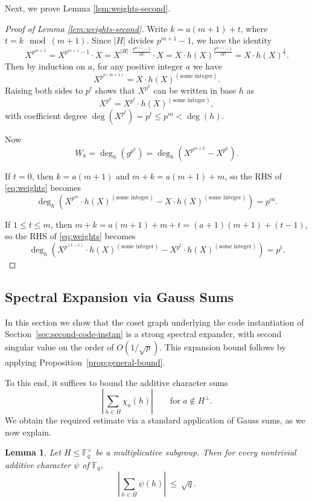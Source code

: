 \documentclass[11pt]{article}
\theoremstyle{plain}
\newtheorem{lemma}[theorem]{Lemma}
\theoremstyle{definition}
\begin{document}
Next, we prove Lemma \ref{lem:weights-second}.
\begin{proof}[Proof of Lemma \ref{lem:weights-second}] Write $k=a(m+1)+t$, where $t=k\mod (m+1).$ 
Since $|H|$ divides $p^{m+1}-1$, we have the identity
\[
X^{p^{m+1}} = X^{p^{m+1}-1}\cdot X = X^{|H|\cdot \frac{p^{m+1}-1}{|H|}}\cdot X
= X\cdot h(X)^{\frac{p^{m+1}-1}{|H|}}
= X\cdot h(X)^{\frac{1}{\gamma}}.
\]
Then by induction on $a$, for any positive integer $a$ we have
\[
X^{p^{a(m+1)}}=X\cdot h(X)^{(\text{some integer})}.
\]
Raising both sides to $p^t$ shows that $X^{p^k}$ can be written in base $h$ as
\[
X^{p^k}=X^{p^t}\cdot h(X)^{(\text{some integer})},
\]
with coefficient degree $\deg(X^{p^t})=p^t\leq p^m<\deg(h)$.

Now
\begin{equation}
\label{eq:weights}
W_k=\deg_h\left(g^{p^k}\right) = \deg_h\left(X^{p^{m+k}}-X^{p^k}\right).
\end{equation}

If $t=0$, then $k=a(m+1)$ and $m+k=a(m+1)+m$, so the RHS of \eqref{eq:weights} becomes
$$\deg_h\left(
X^{p^m}\cdot h(X)^{(\text{some integer})}-X\cdot h(X)^{(\text{some integer})}
\right)=p^m.$$



If $1\le t\le m$, then $m+k=a(m+1)+m+t=(a+1)(m+1)+(t-1)$,
so the RHS of \eqref{eq:weights} becomes
$$\deg_h\left(
X^{p^{(t-1)}}\cdot h(X)^{(\text{some integer})}-X^{p^t}\cdot h(X)^{(\text{some integer})}
\right)=p^t.$$
\end{proof}


\subsection{Spectral Expansion via Gauss Sums}
In this section we show that the coset graph underlying the code instantiation of Section~\ref{sec:second-code-instan} is a strong spectral expander, with second singular value on the order of $O(1/\sqrt{p})$. This expansion bound follows by applying Proposition~\ref{prop:general-bound}. 

To this end, it suffices to bound the additive character sums
\[
\left|\sum_{h\in H}\chi_a(h)\right|
\qquad\text{for } a\notin H^\perp.
\]
We obtain the required estimate via a standard application of Gauss sums, as we now explain.

\begin{lemma}
\label{lem:gauss-subgroup}
Let $H\le \mathbb F_q^\times$ be a multiplicative subgroup.
Then for every nontrivial additive character $\psi$ of $\mathbb F_q$,
\[
\left|\sum_{h\in H}\psi(h)\right|\ \le\ \sqrt{q}.
\]
\end{lemma}
\end{document}
